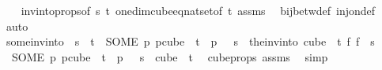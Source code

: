 \begin{isabellebody}
%
\isadelimproof
\ \ %
\endisadelimproof
%
\isatagproof
{}\isamarkupfalse%
\ invintoprops{\isacharbrackleft}{\kern0pt}of\ s\ t{\isacharbrackright}{\kern0pt}\ one{\isacharunderscore}{\kern0pt}dim{\isacharunderscore}{\kern0pt}cube{\isacharunderscore}{\kern0pt}eq{\isacharunderscore}{\kern0pt}nat{\isacharunderscore}{\kern0pt}set{\isacharbrackleft}{\kern0pt}of\ t{\isacharbrackright}{\kern0pt}\ assms\ \isamarkupfalse%
\ bij{\isacharunderscore}{\kern0pt}betw{\isacharunderscore}{\kern0pt}def\ inj{\isacharunderscore}{\kern0pt}on{\isacharunderscore}{\kern0pt}def\ \isamarkupfalse%
\ auto%
\endisatagproof
{\isafoldproof}%
%
\isadelimproof
\isanewline
%
\endisadelimproof
\isanewline
{}\isamarkupfalse%
\ some{\isacharunderscore}{\kern0pt}inv{\isacharunderscore}{\kern0pt}into{\isacharunderscore}{\kern0pt}{}{\isacharcolon}{\kern0pt}\ \ {\isachardoublequoteopen}s\ {\isacharless}{\kern0pt}\ t{\isachardoublequoteclose}\ \ {\isachardoublequoteopen}{\isacharparenleft}{\kern0pt}SOME\ p{\isachardot}{\kern0pt}\ p{\isasymin}cube\ {}\ {\isacharparenleft}{\kern0pt}t{\isacharplus}{\kern0pt}{}{\isacharparenright}{\kern0pt}\ {\isasymand}\ p\ {}\ {\isacharequal}{\kern0pt}\ s{\isacharparenright}{\kern0pt}\ {\isacharequal}{\kern0pt}\ {\isacharparenleft}{\kern0pt}the{\isacharunderscore}{\kern0pt}inv{\isacharunderscore}{\kern0pt}into\ {\isacharparenleft}{\kern0pt}cube\ {}\ t{\isacharparenright}{\kern0pt}\ {\isacharparenleft}{\kern0pt}{\isasymlambda}f{\isachardot}{\kern0pt}\ f\ {}{\isacharparenright}{\kern0pt}\ s{\isacharparenright}{\kern0pt}{\isachardoublequoteclose}\isanewline
%
\isadelimproof
%
\endisadelimproof
%
\isatagproof
{}\isamarkupfalse%
{\isacharminus}{\kern0pt}\isanewline
\ \ \isamarkupfalse%
\ {\isacharasterisk}{\kern0pt}{\isacharcolon}{\kern0pt}\ {\isachardoublequoteopen}{\isacharparenleft}{\kern0pt}SOME\ p{\isachardot}{\kern0pt}\ p{\isasymin}cube\ {}\ {\isacharparenleft}{\kern0pt}t{\isacharplus}{\kern0pt}{}{\isacharparenright}{\kern0pt}\ {\isasymand}\ p\ {}\ {\isacharequal}{\kern0pt}\ s{\isacharparenright}{\kern0pt}\ {\isasymin}\ cube\ {}\ {\isacharparenleft}{\kern0pt}t{\isacharplus}{\kern0pt}{}{\isacharparenright}{\kern0pt}{\isachardoublequoteclose}\ \isamarkupfalse%
\ cube{\isacharunderscore}{\kern0pt}props\ assms\ \isamarkupfalse%
\ simp\isanewline
\ \ \isamarkupfalse%

\end{isabellebody}
